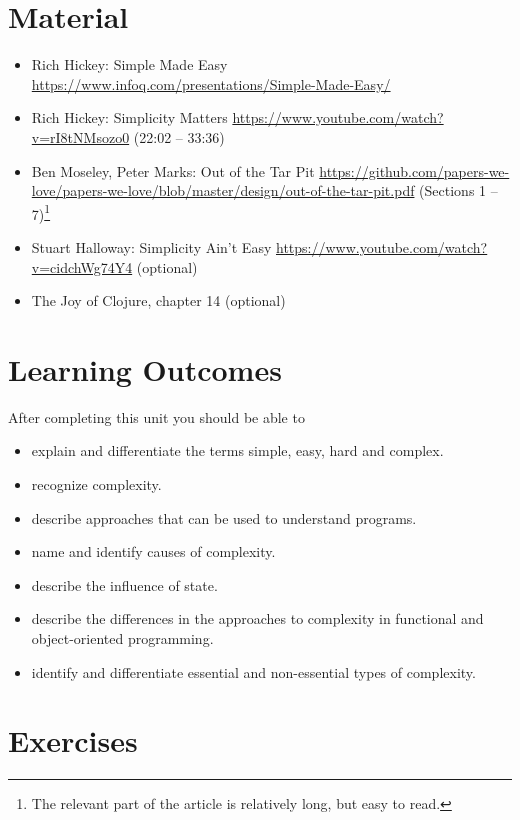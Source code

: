 \documentclass[11pt,a4paper]{article}
\begin{document}

\section{Material} 

\begin{itemize}
\item Rich Hickey: Simple Made Easy \url{https://www.infoq.com/presentations/Simple-Made-Easy/}
\item Rich Hickey: Simplicity Matters \url{https://www.youtube.com/watch?v=rI8tNMsozo0} (22:02 -- 33:36)
\item Ben Moseley, Peter Marks: Out of the Tar Pit \url{https://github.com/papers-we-love/papers-we-love/blob/master/design/out-of-the-tar-pit.pdf} (Sections 1 -- 7)\footnote{The relevant part of the article is relatively long, but easy to read.}
\item Stuart Halloway: Simplicity Ain't Easy \url{https://www.youtube.com/watch?v=cidchWg74Y4} (optional)
\item The Joy of Clojure, chapter 14 (optional)
\end{itemize}


\section{Learning Outcomes}

After completing this unit you should be able to

\begin{itemize}
    \item explain and differentiate the terms simple, easy, hard and complex.
    \item recognize complexity.
    \item describe approaches that can be used to understand programs.
    \item name and identify causes of complexity.
    \item describe the influence of state.
    \item describe the differences in the approaches to complexity in functional and object-oriented programming.
    \item identify and differentiate essential and non-essential types of complexity.
\end{itemize}



\section{Exercises}
\end{document}
